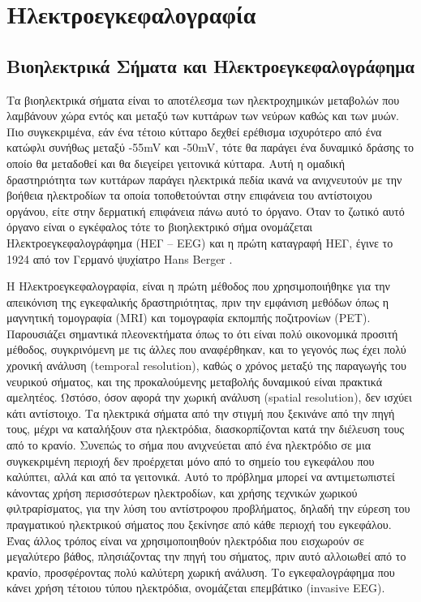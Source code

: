 \documentclass[11pt,a4paper,english,greek,twoside]{../Thesis}
\begin{document}
\chapter{Ηλεκτροεγκεφαλογραφία}
\section{Βιοηλεκτρικά Σήματα και Ηλεκτροεγκεφαλογράφημα}
\par Τα βιοηλεκτρικά σήματα είναι το αποτέλεσμα των ηλεκτροχημικών μεταβολών που λαμβάνουν χώρα εντός και μεταξύ των κυττάρων των νεύρων καθώς και των μυών. Πιο συγκεκριμένα, εάν ένα τέτοιο κύτταρο δεχθεί ερέθισμα ισχυρότερο από ένα κατώφλι συνήθως μεταξύ  -55mV και -50mV, τότε θα παράγει ένα δυναμικό δράσης το οποίο θα μεταδοθεί και θα διεγείρει γειτονικά κύτταρα. Αυτή η ομαδική δραστηριότητα των κυττάρων παράγει ηλεκτρικά πεδία ικανά να ανιχνευτούν με την βοήθεια ηλεκτροδίων τα οποία τοποθετούνται στην επιφάνεια του αντίστοιχου οργάνου, είτε στην δερματική επιφάνεια πάνω αυτό το όργανο. Όταν το ζωτικό αυτό όργανο είναι ο εγκέφαλος τότε το βιοηλεκτρικό σήμα ονομάζεται Ηλεκτροεγκεφαλογράφημα (ΗΕΓ – EEG) και η πρώτη καταγραφή ΗΕΓ, έγινε το 1924 από τον Γερμανό ψυχίατρο Hans Berger \cite{berger1924innervation}. 

\par Η Ηλεκτροεγκεφαλογραφία, είναι η πρώτη μέθοδος που χρησιμοποιήθηκε για την απεικόνιση της εγκεφαλικής δραστηριότητας, πριν την εμφάνιση μεθόδων όπως η μαγνητική τομογραφία (MRI) και τομογραφία εκπομπής ποζιτρονίων (PET). Παρουσιάζει σημαντικά πλεονεκτήματα όπως το ότι είναι πολύ οικονομικά προσιτή μέθοδος, συγκρινόμενη με τις άλλες που αναφέρθηκαν, και το γεγονός πως έχει πολύ χρονική ανάλυση (temporal resolution), καθώς ο χρόνος μεταξύ της παραγωγής του νευρικού σήματος, και της προκαλούμενης μεταβολής δυναμικού είναι πρακτικά αμελητέος. Ωστόσο, όσον αφορά την χωρική ανάλυση (spatial resolution), δεν ισχύει κάτι αντίστοιχο. Τα ηλεκτρικά σήματα από την στιγμή που ξεκινάνε από την πηγή τους, μέχρι να καταλήξουν στα ηλεκτρόδια, διασκορπίζονται κατά την διέλευση τους από το κρανίο. Συνεπώς το σήμα που ανιχνεύεται από ένα ηλεκτρόδιο σε μια συγκεκριμένη περιοχή δεν προέρχεται μόνο από το σημείο του εγκεφάλου που καλύπτει, αλλά και από τα γειτονικά. Αυτό το πρόβλημα μπορεί να αντιμετωπιστεί κάνοντας χρήση περισσότερων ηλεκτροδίων, και χρήσης τεχνικών χωρικού φιλτραρίσματος, για την λύση του αντίστροφου προβλήματος, δηλαδή την εύρεση του πραγματικού ηλεκτρικού σήματος που ξεκίνησε από κάθε περιοχή του εγκεφάλου. Ένας άλλος τρόπος είναι να χρησιμοποιηθούν ηλεκτρόδια που εισχωρούν σε μεγαλύτερο βάθος, πλησιάζοντας την πηγή του σήματος, πριν αυτό αλλοιωθεί από το κρανίο, προσφέροντας πολύ καλύτερη χωρική ανάλυση. Το εγκεφαλογράφημα που κάνει χρήση τέτοιου τύπου ηλεκτρόδια, ονομάζεται επεμβάτικο (invasive EEG).
\end{document}
